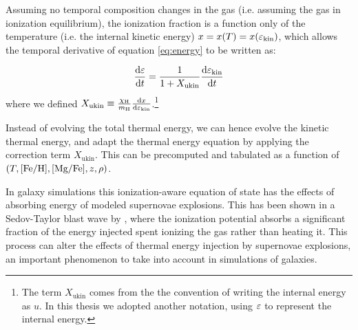 Assuming no temporal composition changes in the gas (i.e. assuming the gas in ionization equilibrium), the ionization fraction is a function only of the temperature (i.e. the internal kinetic energy) $x = x(T) = x(\varepsilon_\text{kin})$, which allows the temporal derivative of equation \eqref{eq:energy} to be written as:

\begin{equation}
\dv{\varepsilon}{t} = \dfrac{1}{ 1 + X_\text{ukin}} \dv{\varepsilon_\text{kin}}{t}
\end{equation}
where we defined $X_\text{ukin} \equiv \frac{\chi_\text H}{m_\text H} \dv{x}{\varepsilon_\text{kin}}$.\footnote{The term $X_\text{ukin}$ comes from the the convention of writing the internal energy as $u$. In this thesis we adopted another notation, using $\varepsilon$ to represent the internal energy.}

Instead of evolving the total thermal energy, we can hence evolve the kinetic thermal energy, and adapt the thermal energy equation by applying the correction term $X_\text{ukin}$.
This can be precomputed and tabulated as a function of $(T, [\text{Fe}/\text{H}], [\text{Mg}/\text{Fe}], z, \rho)$.

In galaxy simulations this ionization-aware equation of state has the effects of absorbing energy of modeled supernovae explosions.
This has been shown in a Sedov-Taylor blast wave by \citet{Vandenbroucke2013}, where the ionization potential absorbs a significant fraction of the energy injected spent ionizing the gas rather than heating it.
This process can alter the effects of thermal energy injection by supernovae explosions, an important phenomenon to take into account in simulations of galaxies.

